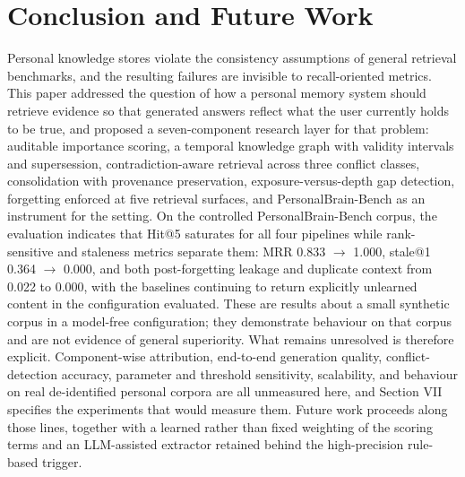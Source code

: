\documentclass[conference]{IEEEtran}
\begin{document}
\section{Conclusion and Future Work}
Personal knowledge stores violate the consistency assumptions of general retrieval benchmarks, and the resulting failures are invisible to recall-oriented metrics. This paper addressed the question of how a personal memory system should retrieve evidence so that generated answers reflect what the user currently holds to be true, and proposed a seven-component research layer for that problem: auditable importance scoring, a temporal knowledge graph with validity intervals and supersession, contradiction-aware retrieval across three conflict classes, consolidation with provenance preservation, exposure-versus-depth gap detection, forgetting enforced at five retrieval surfaces, and PersonalBrain-Bench as an instrument for the setting.
On the controlled PersonalBrain-Bench corpus, the evaluation indicates that Hit@5 saturates for all four pipelines while rank-sensitive and staleness metrics separate them: MRR 0.833 $\rightarrow$ 1.000, stale@1 0.364 $\rightarrow$ 0.000, and both post-forgetting leakage and duplicate context from 0.022 to 0.000, with the baselines continuing to return explicitly unlearned content in the configuration evaluated. These are results about a small synthetic corpus in a model-free configuration; they demonstrate behaviour on that corpus and are not evidence of general superiority.
What remains unresolved is therefore explicit. Component-wise attribution, end-to-end generation quality, conflict-detection accuracy, parameter and threshold sensitivity, scalability, and behaviour on real de-identified personal corpora are all unmeasured here, and Section VII specifies the experiments that would measure them. Future work proceeds along those lines, together with a learned rather than fixed weighting of the scoring terms and an LLM-assisted extractor retained behind the high-precision rule-based trigger.
\end{document}
